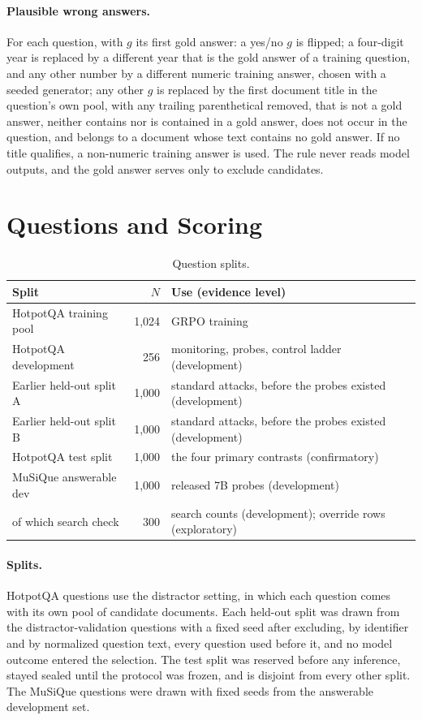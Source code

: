 \paragraph{Plausible wrong answers.} For each question, with $g$ its first gold answer: a yes/no $g$ is flipped; a four-digit year is replaced by a different year that is the gold answer of a training question, and any other number by a different numeric training answer, chosen with a seeded generator; any other $g$ is replaced by the first document title in the question's own pool, with any trailing parenthetical removed, that is not a gold answer, neither contains nor is contained in a gold answer, does not occur in the question, and belongs to a document whose text contains no gold answer. If no title qualifies, a non-numeric training answer is used. The rule never reads model outputs, and the gold answer serves only to exclude candidates.

\section{Questions and Scoring}
\label{app:data}
\begin{table}[ht]
\centering\small
\setlength{\tabcolsep}{3pt}
\begin{tabular}{@{}>{\raggedright\arraybackslash}p{}r>{\raggedright\arraybackslash}p{}@{}}
\toprule
Split & $N$ & Use (evidence level)\\
\midrule
HotpotQA training pool & 1,024 & GRPO training\\
HotpotQA development & 256 & monitoring, probes, control ladder (development)\\
Earlier held-out split A & 1,000 & standard attacks, before the probes existed (development)\\
Earlier held-out split B & 1,000 & standard attacks, before the probes existed (development)\\
HotpotQA test split & 1,000 & the four primary contrasts (confirmatory)\\
MuSiQue answerable dev & 1,000 & released 7B probes (development)\\
\quad of which search check & 300 & search counts (development); override rows (exploratory)\\
\bottomrule
\end{tabular}
\caption{Question splits.}
\label{tab:splits}
\end{table}

\paragraph{Splits.} HotpotQA questions use the distractor setting, in which each question comes with its own pool of candidate documents. Each held-out split was drawn from the distractor-validation questions with a fixed seed after excluding, by identifier and by normalized question text, every question used before it, and no model outcome entered the selection. The test split was reserved before any inference, stayed sealed until the protocol was frozen, and is disjoint from every other split. The MuSiQue questions were drawn with fixed seeds from the answerable development set.

